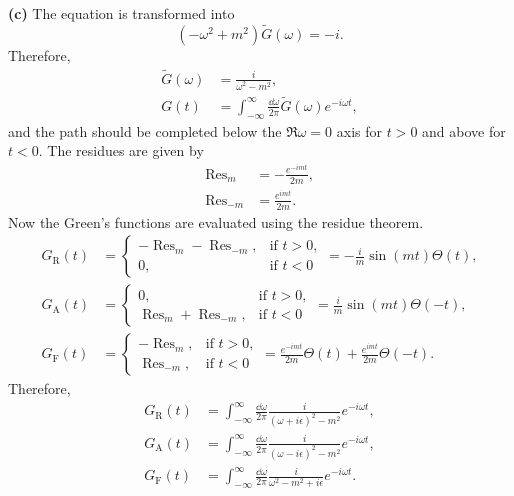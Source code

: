 \documentclass{article}
\makeatletter
\newcommand*{\shifttext}[1]{%
  \settowidth{\@tempdima}{#1}%
  \hspace{-\@tempdima}#1%
}
\newcommand{\plabel}[1]{%
\shifttext{\textbf{#1}\quad}%
}
\makeatother
\begin{document}
\plabel{(c)}%
The equation is transformed into
\[ (-\omega^2 + m^2) \tilde{G}(\omega) = -i. \]
Therefore,
\begin{align*}
    \tilde{G}(\omega) &= \frac{i}{\omega^2 - m^2}, \\
    G(t) &= \int_{-\infty}^\infty \frac{\dd{\omega}}{2\pi} \tilde{G}(\omega) e^{-i\omega t},
\end{align*}
and the path should be completed below the $\Re \omega = 0$ axis for $t>0$ and above for $t<0$.
The residues are given by
\begin{align*}
    \operatorname{Res}_{m} &= -\frac{e^{-imt}}{2m}, \\
    \operatorname{Res}_{-m} &= \frac{e^{imt}}{2m}.
\end{align*}
Now the Green's functions are evaluated using the residue theorem.
\begin{align*}
    G_{\mathrm{R}}(t) &= \begin{cases}
        -\operatorname{Res}_m-\operatorname{Res}_{-m}, & \text{if } t>0, \\
        0, & \text{if } t<0
    \end{cases} = -\frac{i}{m}\sin(mt) \Theta(t), \\
    G_{\mathrm{A}}(t) &= \begin{cases}
        0, & \text{if } t>0, \\
        \operatorname{Res}_m + \operatorname{Res}_{-m}, & \text{if } t<0
    \end{cases} = \frac{i}{m}\sin(mt) \Theta(-t), \\
    G_{\mathrm{F}}(t) &= \begin{cases}
        -\operatorname{Res}_{m}, & \text{if } t>0, \\
        \operatorname{Res}_{-m}, & \text{if } t<0
    \end{cases} = \frac{e^{-imt}}{2m} \Theta(t) + \frac{e^{imt}}{2m} \Theta(-t).
\end{align*}
Therefore,
\begin{align*}
    G_{\mathrm{R}}(t) &= \int_{-\infty}^\infty \frac{\dd{\omega}}{2\pi} \frac{i}{(\omega+i\epsilon)^2 - m^2} e^{-i\omega t}, \\
    G_{\mathrm{A}}(t) &= \int_{-\infty}^\infty \frac{\dd{\omega}}{2\pi} \frac{i}{(\omega-i\epsilon)^2 - m^2} e^{-i\omega t}, \\
    G_{\mathrm{F}}(t) &= \int_{-\infty}^\infty \frac{\dd{\omega}}{2\pi} \frac{i}{\omega^2 - m^2 + i\epsilon} e^{-i\omega t}.
\end{align*}
\end{document}
